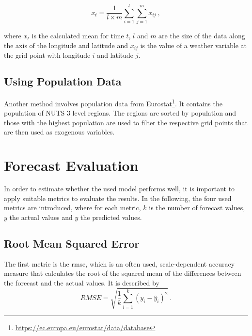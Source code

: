 \begin{equation}
x_t = \frac{1}{l \times m} \sum_{i=1}^{l}\sum_{j=1}^{m}x_{ij}~,
\end{equation}

where $x_t$ is the calculated mean for time $t$, $l$ and $m$ are the size of the data along the axis of the longitude and latitude and $x_{ij}$ is the value of a weather variable at the grid point with longitude $i$ and latitude $j$.

\subsection*{Using Population Data}

Another method involves population data from Eurostat\footnote{\url{https://ec.europa.eu/eurostat/data/database}}. It contains the population of NUTS 3 level regions. The regions are sorted by population and those with the highest population are used to filter the respective grid points that are then used as exogenous variables.\\


\section{Forecast Evaluation}
\label{sec:fceval}

In order to estimate whether the used model performs well, it is important to apply suitable metrics to evaluate the results. In the following, the four used metrics are introduced, where for each metric, $k$ is the number of forecast values, $y$ the actual values and $\hat{y}$ the predicted values.\\

\subsection*{Root Mean Squared Error}

The first metric is the \gls{rmse}, which is an often used, scale-dependent accuracy measure that calculates the root of the squared mean of the differences between the forecast and the actual values. It is described by\\

\begin{equation}
RMSE = \sqrt{\frac{1}{k} \sum_{i=1}^{k} (y_i-\hat{y}_i)^2}~.
\label{eq:rmse}
\end{equation}

